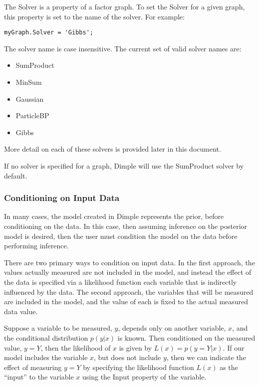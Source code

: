 The Solver is a property of a factor graph.  To set the Solver for a given graph, this property is set to the name of the solver.  For example:

\begin{lstlisting}
myGraph.Solver = 'Gibbs';
\end{lstlisting}

The solver name is case insensitive.  The current set of valid solver names are:

\begin{itemize}
\item SumProduct
\item MinSum
\item Gaussian
\item ParticleBP
\item Gibbs
\end{itemize}

More detail on each of these solvers is provided later in this document.

If no solver is specified for a graph, Dimple will use the SumProduct solver by default.


\subsubsection{Conditioning on Input Data}

In many cases, the model created in Dimple represents the prior, before conditioning on the data.  In this case, then assuming inference on the posterior model is desired, then the user must condition the model on the data before performing inference.

There are two primary ways to condition on input data.  In the first approach, the values actually measured are not included in the model, and instead the effect of the data is specified via a likelihood function each variable that is indirectly influenced by the data.  The second approach, the variables that will be measured are included in the model, and the value of each is fixed to the actual measured data value.

\label{sec:LikelihoodInput}

Suppose a variable to be measured, $y$, depends only on another variable, $x$, and the conditional distribution $p(y|x)$ is known.  Then conditioned on the measured value, $y = Y$, then the likelihood of $x$ is given by $L(x) = p(y = Y | x)$.  If our model includes the variable $x$, but does not include $y$, then we can indicate the effect of measuring $y = Y$ by specifying the likelihood function $L(x)$ as the ``input'' to the variable $x$ using the Input property of the variable.

